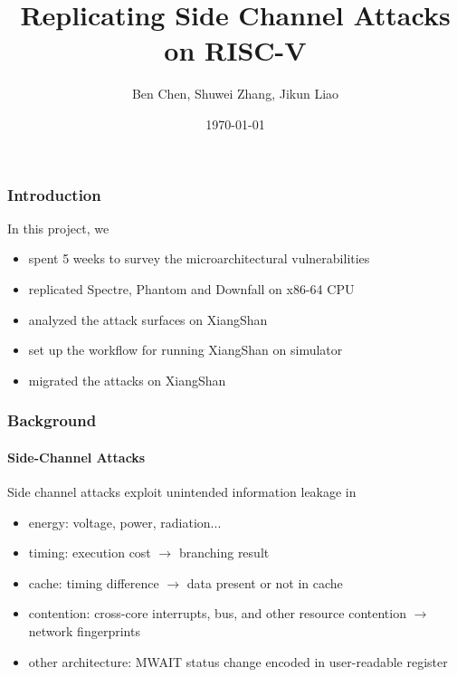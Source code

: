 \documentclass{beamer}
\title{Replicating Side Channel Attacks on RISC-V}
\author{Ben Chen, Shuwei Zhang, Jikun Liao}
\institute{Dept of Computer Science and Technology, SUSTech}
\date{\today}
\begin{document}
\frame{\titlepage}

\begin{frame}
    \frametitle{Introduction}
    In this project, we
    \begin{itemize}[<+->]
        \item spent 5 weeks to survey the microarchitectural vulnerabilities
        \item replicated Spectre, Phantom and Downfall on x86-64 CPU
        \item analyzed the attack surfaces on XiangShan
        \item set up the workflow for running XiangShan on simulator
        \item migrated the attacks on XiangShan
    \end{itemize}
\end{frame}

\begin{frame}
    \frametitle{Background}
    \framesubtitle{Side-Channel Attacks}
    Side channel attacks exploit unintended information leakage in
    \begin{itemize}[<+->]
        \item energy: voltage, power, radiation...
        \item timing: execution cost $\rightarrow$ branching result
        \item cache: timing difference $\rightarrow$ data present or not in cache
        \item contention: cross-core interrupts, bus, and other resource contention $\rightarrow$ network fingerprints
        \item other architecture: MWAIT\cite{mwait} status change encoded in user-readable register
    \end{itemize}
\end{frame}
\end{document}
